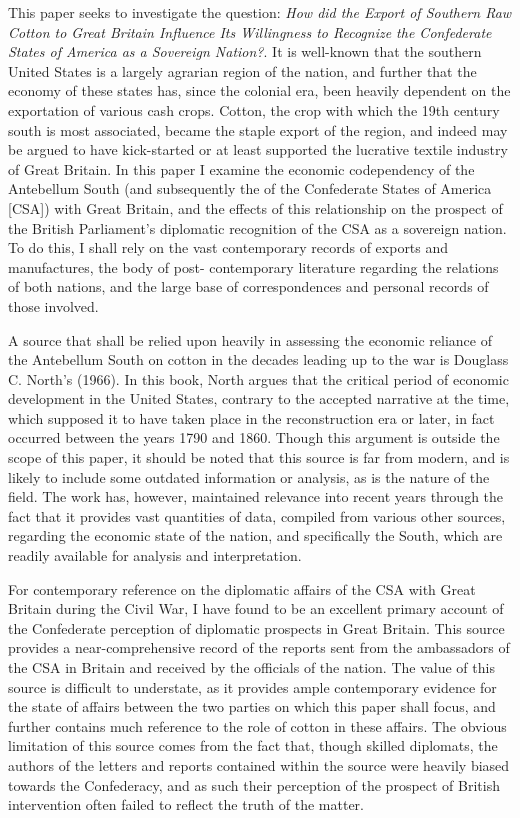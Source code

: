 
This paper seeks to investigate the question: \flq{}\textit{How did the Export of Southern Raw Cotton to Great Britain Influence Its Willingness to Recognize the
Confederate States of America as a Sovereign Nation?}\frq{}. It is well-known that the southern United States is a largely agrarian region of the nation, and further that the 
economy of these states has, since the colonial era, been heavily dependent on the exportation of various \flq{}cash crops\frq{}. Cotton, the crop with which 
the 19th century south is most associated, became the staple export of the region, and indeed may be argued to have kick-started or at least supported the 
lucrative textile industry of Great Britain. In this paper I examine the economic codependency of the Antebellum South (and subsequently the of the 
Confederate States of America [CSA]) with Great Britain, and the effects of this relationship on the prospect of the British Parliament's diplomatic 
recognition of the CSA as a sovereign nation. To do this, I shall rely on the vast contemporary records of exports and manufactures, the body of post-
contemporary literature regarding the relations of both nations, and the large base of correspondences and personal records of those involved.

A source that shall be relied upon heavily in assessing the economic reliance of the Antebellum South on cotton in the decades leading up to the war is 
Douglass C. North's  (1966). In this book, North argues that the critical period of economic development in the United States, 
contrary to the accepted narrative at the time, which supposed it to have taken place in the reconstruction era or later, in fact occurred between the
years 1790 and 1860. Though this argument is outside the scope of this paper, it should be noted that this source is far from modern, and is likely
to include some outdated information or analysis, as is the nature of the field. The work has, however, maintained relevance into recent years
through the fact that it provides vast quantities of data, compiled from various other sources, regarding the economic state of the nation, and specifically
the South, which are readily available for analysis and interpretation.

For contemporary reference on the diplomatic affairs of the CSA with Great Britain during the Civil War, I have found 
to be an excellent primary account of the Confederate perception of diplomatic prospects in Great Britain. This source provides a near-comprehensive 
record of the reports sent from the ambassadors of the CSA in Britain and received by the officials of the nation. The value of this source is difficult
to understate, as it provides ample contemporary evidence for the state of affairs between the two parties on which this paper shall focus, and further
contains much reference to the role of cotton in these affairs. The obvious limitation of this source comes from the fact that, though skilled diplomats,
the authors of the letters and reports contained within the source were heavily biased towards the Confederacy, and as such their perception of the 
prospect of British intervention often failed to reflect the truth of the matter. 